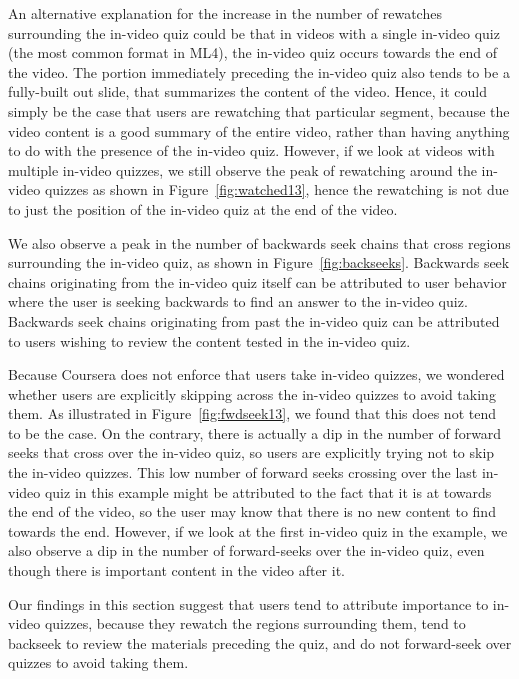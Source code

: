 \documentclass{sigchi}
\begin{document}
An alternative explanation for the increase in the number of rewatches surrounding the in-video quiz could be that in videos with a single in-video quiz (the most common format in ML4), the in-video quiz occurs towards the end of the video. The portion immediately preceding the in-video quiz also tends to be a fully-built out slide, that summarizes the content of the video. Hence, it could simply be the case that users are rewatching that particular segment, because the video content is a good summary of the entire video, rather than having anything to do with the presence of the in-video quiz. However, if we look at videos with multiple in-video quizzes, we still observe the peak of rewatching around the in-video quizzes as shown in Figure~\ref{fig:watched13}, hence the rewatching is not due to just the position of the in-video quiz at the end of the video.

We also observe a peak in the number of backwards seek chains that cross regions surrounding the in-video quiz, as shown in Figure~\ref{fig:backseeks}. Backwards seek chains originating from the in-video quiz itself can be attributed to user behavior where the user is seeking backwards to find an answer to the in-video quiz. Backwards seek chains originating from past the in-video quiz can be attributed to users wishing to review the content tested in the in-video quiz.

Because Coursera does not enforce that users take in-video quizzes, we wondered whether users are explicitly skipping across the in-video quizzes to avoid taking them. As illustrated in Figure~\ref{fig:fwdseek13}, we found that this does not tend to be the case. On the contrary, there is actually a dip in the number of forward seeks that cross over the in-video quiz, so users are explicitly trying not to skip the in-video quizzes. This low number of forward seeks crossing over the last in-video quiz in this example might be attributed to the fact that it is at towards the end of the video, so the user may know that there is no new content to find towards the end. However, if we look at the first in-video quiz in the example, we also observe a dip in the number of forward-seeks over the in-video quiz, even though there is important content in the video after it.

Our findings in this section suggest that users tend to attribute importance to in-video quizzes, because they rewatch the regions surrounding them, tend to backseek to review the materials preceding the quiz, and do not forward-seek over quizzes to avoid taking them.
\end{document}
